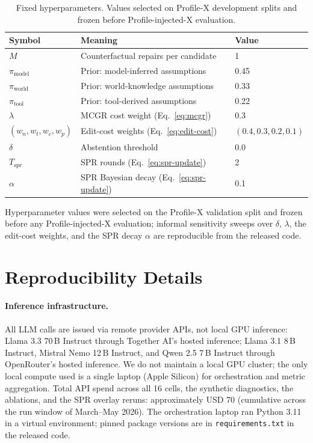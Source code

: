 \documentclass{article}
\newcommand{\mcgr}{\textsc{MCGR}\xspace}
\begin{document}
\begin{table}[h]\centering\small
\caption{Fixed hyperparameters. Values selected on Profile-X development splits and frozen before Profile-injected-X evaluation.}
\label{tab:hparams}
\begin{tabular}{lll}\toprule
Symbol & Meaning & Value \\\midrule
$M$ & Counterfactual repairs per candidate & 1 \\
$\pi_{\text{model}}$ & Prior: model-inferred assumptions & 0.45 \\
$\pi_{\text{world}}$ & Prior: world-knowledge assumptions & 0.33 \\
$\pi_{\text{tool}}$ & Prior: tool-derived assumptions & 0.22 \\
$\lambda$ & \mcgr cost weight (Eq.~\ref{eq:mcgr}) & 0.3 \\
$(w_n, w_t, w_c, w_p)$ & Edit-cost weights (Eq.~\ref{eq:edit-cost}) & $(0.4, 0.3, 0.2, 0.1)$ \\
$\delta$ & Abstention threshold & 0.0 \\
$T_{\text{spr}}$ & SPR rounds (Eq.~\ref{eq:spr-update}) & 2 \\
$\alpha$ & SPR Bayesian decay (Eq.~\ref{eq:spr-update}) & 0.1 \\
\bottomrule\end{tabular}\end{table}

Hyperparameter values were selected on the Profile-X validation split and frozen before any Profile-injected-X evaluation; informal sensitivity sweeps over $\delta$, $\lambda$, the edit-cost weights, and the SPR decay $\alpha$ are reproducible from the released code.

\section{Reproducibility Details}\label{app:repro}

\paragraph{Inference infrastructure.} All LLM calls are issued via remote provider APIs, not local GPU inference: Llama 3.3 70\,B Instruct through Together AI's hosted inference; Llama 3.1 8\,B Instruct, Mistral Nemo 12\,B Instruct, and Qwen 2.5 7\,B Instruct through OpenRouter's hosted inference. We do not maintain a local GPU cluster; the only local compute used is a single laptop (Apple Silicon) for orchestration and metric aggregation. Total API spend across all 16 cells, the synthetic diagnostics, the ablations, and the SPR overlay reruns: approximately USD 70 (cumulative across the run window of March--May 2026). The orchestration laptop ran Python 3.11 in a virtual environment; pinned package versions are in \texttt{requirements.txt} in the released code.
\end{document}
